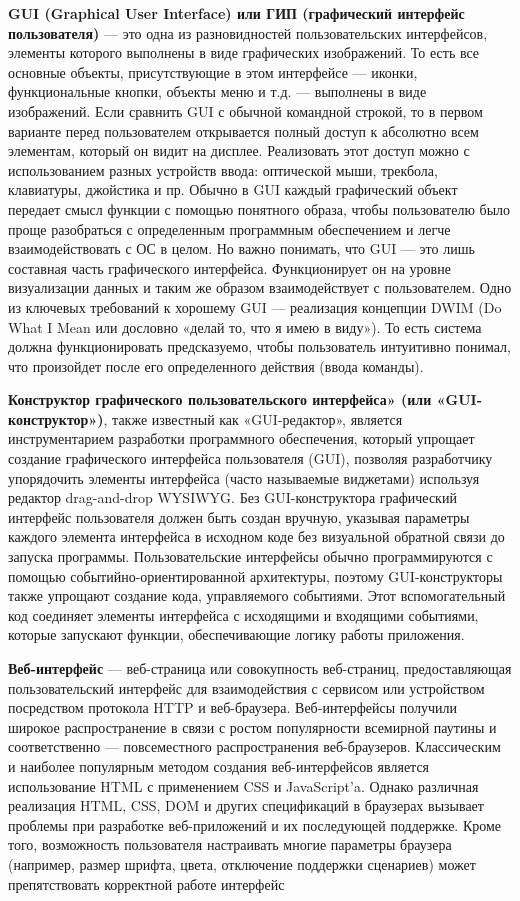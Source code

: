 \documentclass[a4paper]{article}
\begin{document}
\textbf{GUI (Graphical User Interface) или ГИП (графический интерфейс пользователя)} --- это одна из разновидностей пользовательских интерфейсов, элементы которого выполнены в виде графических изображений. То есть все основные объекты, присутствующие в этом интерфейсе — иконки, функциональные кнопки, объекты меню и т.д. — выполнены в виде изображений. Если сравнить GUI с обычной командной строкой, то в первом варианте перед пользователем открывается полный доступ к абсолютно всем элементам, который он видит на дисплее. Реализовать этот доступ можно с использованием разных устройств ввода: оптической мыши, трекбола, клавиатуры, джойстика и пр. Обычно в GUI каждый графический объект передает смысл функции с помощью понятного образа, чтобы пользователю было проще разобраться с определенным программным обеспечением и легче взаимодействовать с ОС в целом. Но важно понимать, что GUI — это лишь составная часть графического интерфейса. Функционирует он на уровне визуализации данных и таким же образом взаимодействует с пользователем. Одно из ключевых требований к хорошему GUI — реализация концепции DWIM (Do What I Mean или дословно «делай то, что я имею в виду»). То есть система должна функционировать предсказуемо, чтобы пользователь интуитивно понимал, что произойдет после его определенного действия (ввода команды).

\textbf{Конструктор графического пользовательского интерфейса» (или «GUI-конструктор»)}, также известный как «GUI-редактор», является инструментарием разработки программного обеспечения, который упрощает создание графического интерфейса пользователя (GUI), позволяя разработчику упорядочить элементы интерфейса (часто называемые виджетами) используя редактор drag-and-drop WYSIWYG. Без GUI-конструктора графический интерфейс пользователя должен быть создан вручную, указывая параметры каждого элемента интерфейса в исходном коде без визуальной обратной связи до запуска программы. Пользовательские интерфейсы обычно программируются с помощью событийно-ориентированной архитектуры, поэтому GUI-конструкторы также упрощают создание кода, управляемого событиями. Этот вспомогательный код соединяет элементы интерфейса с исходящими и входящими событиями, которые запускают функции, обеспечивающие логику работы приложения.

\textbf{Веб-интерфейс} --- веб-страница или совокупность веб-страниц, предоставляющая пользовательский интерфейс для взаимодействия с сервисом или устройством посредством протокола HTTP и веб-браузера. Веб-интерфейсы получили широкое распространение в связи с ростом популярности всемирной паутины и соответственно — повсеместного распространения веб-браузеров. Классическим и наиболее популярным методом создания веб-интерфейсов является использование HTML с применением CSS и JavaScript'a. Однако различная реализация HTML, CSS, DOM и других спецификаций в браузерах вызывает проблемы при разработке веб-приложений и их последующей поддержке. Кроме того, возможность пользователя настраивать многие параметры браузера (например, размер шрифта, цвета, отключение поддержки сценариев) может препятствовать корректной работе интерфейс
\end{document}
